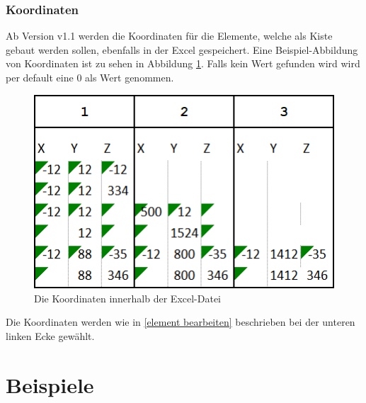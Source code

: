 \documentclass{book}
\begin{document}
		\subsection{Koordinaten}
			Ab Version v1.1 werden die Koordinaten für die Elemente, welche als Kiste gebaut werden sollen, ebenfalls in der Excel gespeichert. Eine Beispiel-Abbildung von Koordinaten ist zu sehen in Abbildung \ref{fig:koordinaten}. Falls kein Wert gefunden wird wird per default eine 0 als Wert genommen.
			\begin{figure}
				\centering
				\includegraphics[scale=0.48]{pics/excel/koordinaten.png}
				\caption{Die Koordinaten innerhalb der Excel-Datei}
				\label{fig:koordinaten}
			\end{figure}
			Die Koordinaten werden wie in \ref{element bearbeiten} beschrieben bei der unteren linken Ecke gewählt.
	\chapter{Beispiele}
		
\end{document}
